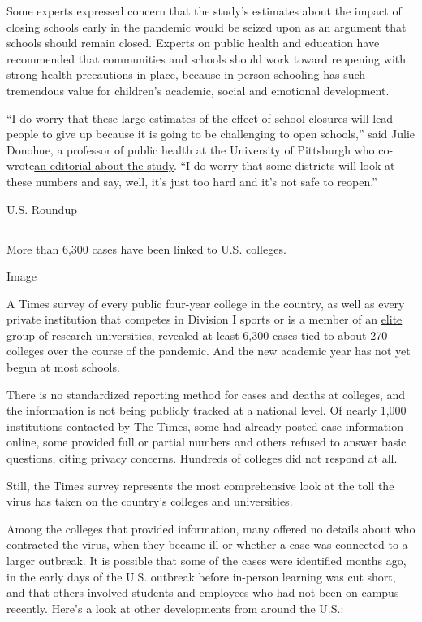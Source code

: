 Some experts expressed concern that the study's estimates about the
impact of closing schools early in the pandemic would be seized upon as
an argument that schools should remain closed. Experts on public health
and education have recommended that communities and schools should work
toward reopening with strong health precautions in place, because
in-person schooling has such tremendous value for children's academic,
social and emotional development.

``I do worry that these large estimates of the effect of school closures
will lead people to give up because it is going to be challenging to
open schools,'' said Julie Donohue, a professor of public health at the
University of Pittsburgh who
co-wrote\href{https://jamanetwork.com/journals/jama/fullarticle/10.1001/jama.2020.13092}{an
editorial about the study}. ``I do worry that some districts will look
at these numbers and say, well, it's just too hard and it's not safe to
reopen.''

U.S. Roundup

\hypertarget{-6}{%
\subsection{}\label{-6}}

More than 6,300 cases have been linked to U.S. colleges.

Image

A Times survey of every public four-year college in the country, as well
as every private institution that competes in Division I sports or is a
member of an
\href{https://www.aau.edu/sites/default/files/AAU-Files/Who-We-Are/AAU-Member-List.pdf}{elite
group of research universities}, revealed at least 6,300 cases tied to
about 270 colleges over the course of the pandemic. And the new academic
year has not yet begun at most schools.

There is no standardized reporting method for cases and deaths at
colleges, and the information is not being publicly tracked at a
national level. Of nearly 1,000 institutions contacted by The Times,
some had already posted case information online, some provided full or
partial numbers and others refused to answer basic questions, citing
privacy concerns. Hundreds of colleges did not respond at all.

Still, the Times survey represents the most comprehensive look at the
toll the virus has taken on the country's colleges and universities.

Among the colleges that provided information, many offered no details
about who contracted the virus, when they became ill or whether a case
was connected to a larger outbreak. It is possible that some of the
cases were identified months ago, in the early days of the U.S. outbreak
before in-person learning was cut short, and that others involved
students and employees who had not been on campus recently. Here's a
look at other developments from around the U.S.:

